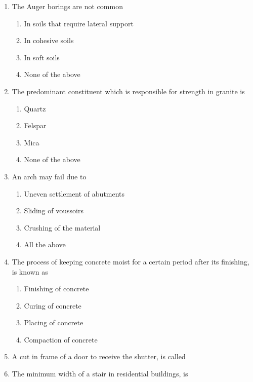 \documentclass[11pt,a4paper]{article}
\begin{document}
\begin{enumerate}
\begin{enumerate}[label=\Alph*.]
\end{enumerate}
\item{The Auger borings are not common}
\begin{enumerate}[label=\Alph*.]
\item{In soils that require lateral support}
\item{In cohesive soils}
\item{In soft soils}
\item{None of the above}
\end{enumerate}
\item{The predominant constituent which is responsible for strength in granite is}
\begin{enumerate}[label=\Alph*.]
\item{Quartz}
\item{Felspar}
\item{Mica}
\item{None of the above}
\end{enumerate}
\item{An arch may fail due to}
\begin{enumerate}[label=\Alph*.]
\item{Uneven settlement of abutments}
\item{Sliding of voussoirs}
\item{Crushing of the material}
\item{All the above}
\end{enumerate}
\item{The process of keeping concrete moist for a certain period after its finishing, is known as}
\begin{enumerate}[label=\Alph*.]
\item{Finishing of concrete}
\item{Curing of concrete}
\item{Placing of concrete}
\item{Compaction of concrete}
\end{enumerate}
\item{A cut in frame of a door to receive the shutter, is called}
\\
\item{The minimum width of a stair in residential buildings, is}

\end{enumerate}
\end{document}
